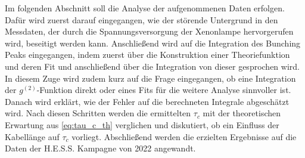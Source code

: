 Im folgenden Abschnitt soll die Analyse der aufgenommenen Daten erfolgen. 
Dafür wird zuerst darauf eingegangen, wie der störende Untergrund in den Messdaten, der durch die Spannungsversorgung der Xenonlampe hervorgerufen wird, beseitigt werden kann. 
Anschließend wird auf die Integration des Bunching Peaks eingegangen, indem zuerst über die Konstruktion einer Theoriefunktion und deren Fit und anschließend über die Integration von dieser gesprochen wird. 
In diesem Zuge wird zudem kurz auf die Frage eingegangen, ob eine Integration der $g^{(2)}$-Funktion direkt oder eines Fits für die weitere Analyse sinnvoller ist. 
Danach wird erklärt, wie der Fehler auf die berechneten Integrale abgeschätzt wird. 
Nach diesen Schritten werden die ermittelten $\tau_c$ mit der theoretischen Erwartung aus \autoref{eq:tau_c_th} verglichen und diskutiert, ob ein Einfluss der Kabellänge auf $\tau_c$ vorliegt. 
Abschließend werden die erzielten Ergebnisse auf die Daten der H.E.S.S. Kampagne von 2022 angewandt. 

